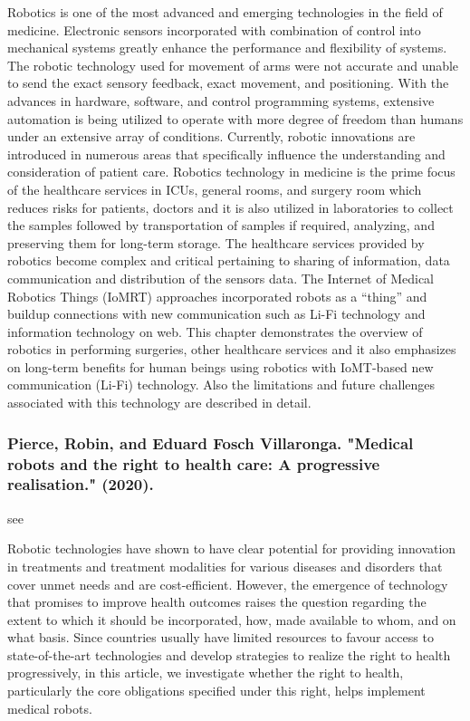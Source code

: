 \documentclass[conference]{IEEEtran}
\begin{document}
Robotics is one of the most advanced and emerging technologies in the field of medicine. Electronic sensors incorporated with combination of control into mechanical systems greatly enhance the performance and flexibility of systems. The robotic technology used for movement of arms were not accurate and unable to send the exact sensory feedback, exact movement, and positioning. With the advances in hardware, software, and control programming systems, extensive automation is being utilized to operate with more degree of freedom than humans under an extensive array of conditions. Currently, robotic innovations are introduced in numerous areas that specifically influence the understanding and consideration of patient care. Robotics technology in medicine is the prime focus of the healthcare services in ICUs, general rooms, and surgery room which reduces risks for patients, doctors and it is also utilized in laboratories to collect the samples followed by transportation of samples if required, analyzing, and preserving them for long-term storage. The healthcare services provided by robotics become complex and critical pertaining to sharing of information, data communication and distribution of the sensors data. The Internet of Medical Robotics Things (IoMRT) approaches incorporated robots as a “thing” and buildup connections with new communication such as Li-Fi technology and information technology on web. This chapter demonstrates the overview of robotics in performing surgeries, other healthcare services and it also emphasizes on long-term benefits for human beings using robotics with IoMT-based new communication (Li-Fi) technology. Also the limitations and future challenges associated with this technology are described in detail.

\medskip
\subsubsection{Pierce, Robin, and Eduard Fosch Villaronga. "Medical robots and the right to health care: A progressive realisation." (2020).}
see \cite{pierce2020medical}

Robotic technologies have shown to have clear potential for providing innovation in treatments and treatment modalities for various diseases and disorders that cover unmet needs and are cost-efficient. However, the emergence of technology that promises to improve health outcomes raises the question regarding the extent to which it should be incorporated, how, made available to whom, and on what basis. Since countries usually have limited resources to favour access to state-of-the-art technologies and develop strategies to realize the right to health progressively, in this article, we investigate whether the right to health, particularly the core obligations specified under this right, helps implement medical robots.
\end{document}
